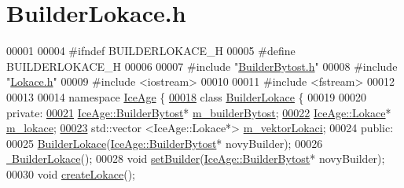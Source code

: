 \hypertarget{BuilderLokace_8h_source}{}\section{Builder\+Lokace.\+h}
\label{BuilderLokace_8h_source}

\begin{DoxyCode}
00001 
00004 \textcolor{preprocessor}{#ifndef BUILDERLOKACE\_H}
00005 \textcolor{preprocessor}{#define BUILDERLOKACE\_H}
00006 
00007 \textcolor{preprocessor}{#include "\hyperlink{BuilderBytost_8h}{BuilderBytost.h}"}
00008 \textcolor{preprocessor}{#include "\hyperlink{Lokace_8h}{Lokace.h}"}
00009 \textcolor{preprocessor}{#include <iostream>}
00010 
00011 \textcolor{preprocessor}{#include <fstream>}
00012 
00013 
00014 \textcolor{keyword}{namespace }\hyperlink{namespaceIceAge}{IceAge} \{
\hypertarget{BuilderLokace_8h_source.tex_l00018}{}\hyperlink{classIceAge_1_1BuilderLokace}{00018}     \textcolor{keyword}{class }\hyperlink{classIceAge_1_1BuilderLokace}{BuilderLokace} \{
00019 
00020     \textcolor{keyword}{private}:
\hypertarget{BuilderLokace_8h_source.tex_l00021}{}\hyperlink{classIceAge_1_1BuilderLokace_ac6981c43c22713d56e7ccbefa8b5c8b4}{00021}         \hyperlink{classIceAge_1_1BuilderBytost}{IceAge::BuilderBytost}* \hyperlink{classIceAge_1_1BuilderLokace_ac6981c43c22713d56e7ccbefa8b5c8b4}{m\_builderBytost};
\hypertarget{BuilderLokace_8h_source.tex_l00022}{}\hyperlink{classIceAge_1_1BuilderLokace_aad0fb17bf38c03cd767e100758348f24}{00022}         \hyperlink{classIceAge_1_1Lokace}{IceAge::Lokace}* \hyperlink{classIceAge_1_1BuilderLokace_aad0fb17bf38c03cd767e100758348f24}{m\_lokace};
\hypertarget{BuilderLokace_8h_source.tex_l00023}{}\hyperlink{classIceAge_1_1BuilderLokace_a110ada142d159f68fb82382a47d088f4}{00023}         std::vector <IceAge::Lokace*> \hyperlink{classIceAge_1_1BuilderLokace_a110ada142d159f68fb82382a47d088f4}{m\_vektorLokaci};
00024     \textcolor{keyword}{public}:
00025         \hyperlink{classIceAge_1_1BuilderLokace_ad8fabba0bddf2d2569c36fa115f40673}{BuilderLokace}(\hyperlink{classIceAge_1_1BuilderBytost}{IceAge::BuilderBytost}* novyBuilder);
00026         \hyperlink{classIceAge_1_1BuilderLokace_ae90ede622f89433692f5d4c17fd35ffb}{~BuilderLokace}();
00028         \textcolor{keywordtype}{void} \hyperlink{classIceAge_1_1BuilderLokace_acce53b24cfb8ab5227520e943e6b843b}{setBuilder}(\hyperlink{classIceAge_1_1BuilderBytost}{IceAge::BuilderBytost}* novyBuilder);
00030         \textcolor{keywordtype}{void} \hyperlink{classIceAge_1_1BuilderLokace_ac46d7d1ff685c51dbd382f65b29a6546}{createLokace}();

\end{DoxyCode}
